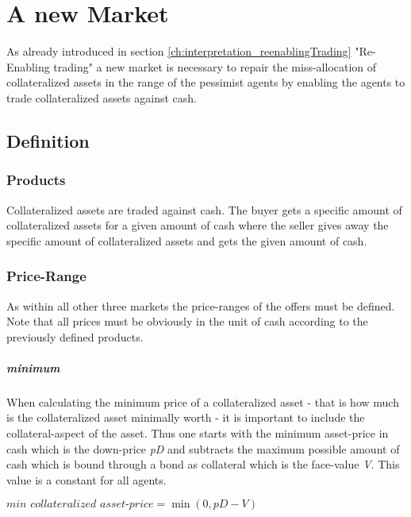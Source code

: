 \documentclass[Bachelorarbeit.tex]{subfiles}
\begin{document}
\graphicspath{{./figures/newMarket/}}	%

\chapter{A new Market}
\label{ch:newMarket}
As already introduced in section \ref{ch:interpretation_reenablingTrading} "Re-Enabling trading" a new market is necessary to repair the miss-allocation of collateralized assets in the range of the pessimist agents by enabling the agents to trade collateralized assets against cash.

\section{Definition}
\subsection{Products}
Collateralized assets are traded against cash. The buyer gets a specific amount of collateralized assets for a given amount of cash where the seller gives away the specific amount of collateralized assets and gets the given amount of cash.

\subsection{Price-Range}
As within all other three markets the price-ranges of the offers must be defined. Note that all prices must be obviously in the unit of cash according to the previously defined products.

\paragraph{minimum}
When calculating the minimum price of a collateralized asset - that is how much is the collateralized asset minimally worth - it is important to include the collateral-aspect of the asset. Thus one starts with the minimum asset-price in cash which is the down-price \textit{pD} and subtracts the maximum possible amount of cash which is bound through a bond as collateral which is the face-value \textit{V}. This value is a constant for all agents.

\begin{center}
$\textit{min collateralized asset-price} = \min(0, \textit{pD} - \textit{V})$
\end{center}
 
\end{document}
